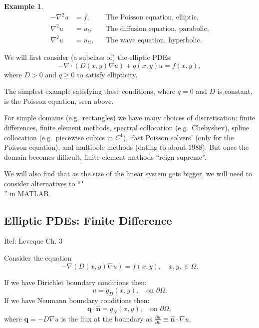 \documentclass[12pt, a4paper]{article}
\renewcommand{\vec}[1]{\mathbf{#1}}
\theoremstyle{definition}
\newtheorem{example}[thm]{Example}
\theoremstyle{remark}
\numberwithin{equation}{section}
\newcommand\bslash{\char`\\}
\begin{document}
\begin{example}
\begin{align*}
-\nabla^2u&=f, &&\mbox{The Poisson equation, elliptic,}\\
\nabla^2u&=u_t, &&\mbox{The diffusion equation, parabolic,}\\
\nabla^2u&=u_{tt}, &&\mbox{The wave equation, hyperbolic.}
\end{align*}
\end{example}

We will first consider (a subclass of) the elliptic PDEs:
\begin{equation*}
-\nabla \cdot (D(x,y)\nabla u) + q(x,y)u=f(x,y),
\end{equation*}
where $D>0$ and $q \ge 0$ to satisfy ellipticity.

The simplest example satisfying these conditions, where $q=0$ and $D$ is constant, is the Poisson equation, seen above.

For simple domains (e.g.\ rectangles) we have many choices of discretisation: finite differences, finite element methods, spectral collocation (e.g.\ Chebyshev), spline collocation (e.g.\ piecewise cubics in $C^1$), `fast Poisson solvers' (only for the Poisson equation), and multipole methods (dating to about  1988).
But once the domain becomes difficult, finite element methods ``reign supreme''.

We will also find that as the size of the linear system gets bigger,  we will need to consider alternatives to ``\texttt{\bslash}'' in MATLAB. 

\newpage
\subsection[FDM for elliptic equation]{Elliptic PDEs: Finite Difference} 
Ref: Leveque Ch. 3

Consider the equation
\begin{equation*}
-\nabla (D(x,y)\nabla u)=f(x,y), \quad x,y, \in \Omega.
\end{equation*}

If we have Dirichlet boundary conditions then:
\begin{equation*}
u=g_D(x,y), \quad \mbox{on $\partial \Omega$}.
\end{equation*}
If we have Neumann boundary conditions then:
\begin{equation*}
\vec{q}\cdot\hat{\vec{n}}
=g_N(x,y),
\quad \mbox{on $\partial \Omega$},
\end{equation*}
where $\vec{q} = -D \nabla u$ is the flux at the boundary as $\frac{\partial u}{\partial n} \equiv
\hat{\vec{n}} \cdot \nabla u$.
\end{document}
